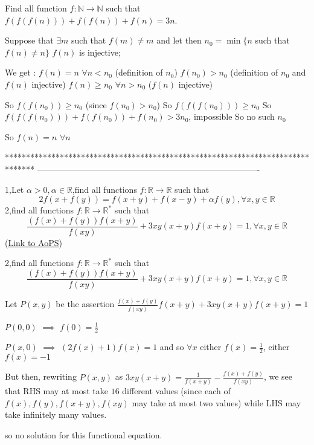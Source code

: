 \begin{solution}
	\begin{tcolorbox}Find all function $f: \mathbb{N} \rightarrow \mathbb{N}$ such that $f( f( f(n)))+f(f(n))+f(n)=3n$.\end{tcolorbox}
Suppose that $\exists m$ such that $f(m)\ne m$ and let then $n_0=\min\{n$ such that $f(n)\ne n\}$
$f(n)$ is injective;

We get :
$f(n)=n$ $\forall n<n_0$ (definition of $n_0$)
$f(n_0)> n_0$ (definition of $n_0$ and $f(n)$ injective)
$f(n)\ge n_0$ $\forall n> n_0$ ($f(n)$ injective)

So $f(f(n_0))\ge n_0$ (since $f(n_0)>n_0$)
So $f(f(f(n_0)))\ge n_0$
So $f(f(f(n_0)))+f(f(n_0))+f(n_0)>3n_0$, impossible
So no such $n_0$

So $\boxed{f(n)=n}$ $\forall n$
\end{solution}
*******************************************************************************
-------------------------------------------------------------------------------

\begin{problem}
	1,Let $\alpha >0,\alpha \in\mathbb{R}$,find all functions $f:\mathbb{R}\to\mathbb{R}$ such that \[ 2 f(x+f(y))=f(x+y)+f(x-y)+\alpha f(y),\forall x,y\in \mathbb{R}\] 
2,find all functions $f:\mathbb{R}\to\mathbb{R^{*}}$ such that \[\frac{(f(x)+f(y))f(x+y)}{f(xy)}+3xy(x+y)f(x+y)=1,\forall x,y\in\mathbb{R}\]
	\flushright \href{https://artofproblemsolving.com/community/c6h527619}{(Link to AoPS)}
\end{problem}



\begin{solution}
	\begin{tcolorbox}2,find all functions $f:\mathbb{R}\to\mathbb{R^{*}}$ such that \[\frac{(f(x)+f(y))f(x+y)}{f(xy)}+3xy(x+y)f(x+y)=1,\forall x,y\in\mathbb{R}\]\end{tcolorbox}
Let $P(x,y)$ be the assertion $\frac{f(x)+f(y)}{f(xy)}f(x+y)+3xy(x+y)f(x+y)=1$

$P(0,0)$ $\implies$ $f(0)=\frac 12$

$P(x,0)$ $\implies$ $(2f(x)+1)f(x)=1$ and so $\forall x$ either $f(x)=\frac 12$, either $f(x)=-1$

But then, rewriting $P(x,y)$ as $3xy(x+y)=\frac 1{f(x+y)}-\frac{f(x)+f(y)}{f(xy)}$, we see that RHS may at most take $16$ different values (since each of $f(x), f(y), f(x+y), f(xy)$ may take at most two values) while LHS may take infinitely many values.

so no solution for this functional equation.
\end{solution}



